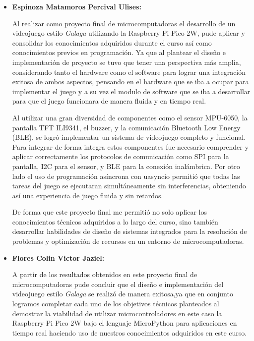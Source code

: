\documentclass[letterpaper,12pt]{article}
\begin{document}
    \begin{itemize}
        \item \textbf{Espinoza Matamoros Percival Ulises:} 
        
        Al realizar como proyecto final de microcomputadoras el desarrollo de un videojuego estilo \textit{Galaga} utilizando la Raspberry Pi Pico 2W, pude aplicar y consolidar los conocimientos adquiridos durante el curso así como conocimientos previos en programación. Ya que al plantear el diseño e implementación de proyecto se tuvo que tener una perspectiva más amplia, considerando tanto el hardware como el software para lograr una integración exitosa de ambos aspectos, pensando en el hardware que se iba a ocupar para implementar el juego y a su vez el modulo de software que se iba a desarrollar para que el juego funcionara de manera fluida y en tiempo real.
        
        Al utilizar una gran diversidad de componentes como el sensor MPU-6050, la pantalla TFT ILI9341, el buzzer, y la comunicación Bluetooth Low Energy (BLE), se logró implementar un sistema de videojuego completo y funcional. Para integrar de forma integra estos componentes fue necesario comprender y aplicar correctamente los protocolos de comunicación como SPI para la pantalla, I2C para el sensor, y BLE para la conexión inalámbrica. Por otro lado el
        uso de programación asíncrona con uasyncio permitió que todas las tareas del juego se ejecutaran simultáneamente sin interferencias, obteniendo así una experiencia de juego fluida y sin retardos.

        De forma que este proyecto final me permitió no solo aplicar los conocimientos técnicos adquiridos a lo largo del  curso, sino también desarrollar habilidades de diseño de sistemas integrados para la resolución de problemas y optimización de recursos en un entorno de microcomputadoras.

        \item \textbf{Flores Colin Victor Jaziel:}
        
        A partir de los resultados obtenidos en este proyecto final de microcomputadoras pude concluir que el diseño e implementación del videojuego estilo \textit{Galaga} se realizó de manera exitosa,ya que en conjunto logramos completar cada uno de los objetivos técnicos planteados al demostrar la viabilidad de utilizar microcontroladores en este caso la Raspberry Pi Pico 2W bajo el lenguaje MicroPython para aplicaciones en tiempo real haciendo uso de nuestros conocimientos adquiridos en este curso. 
        

\end{itemize}
\end{document}

